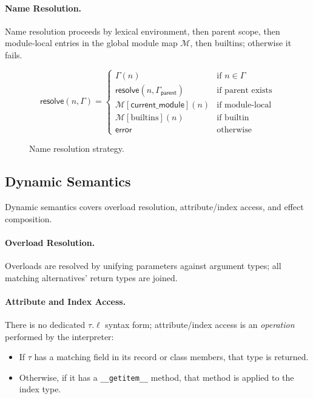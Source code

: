 \paragraph{Name Resolution.}  
Name resolution proceeds by lexical environment, then parent scope, then module‐local entries in the global module map $\mathcal{M}$, then builtins; otherwise it fails.

\begin{figure*}[t]
\centering
\[
\mathsf{resolve}(n, \Gamma) =
\begin{cases}
\Gamma(n) & \text{if } n \in \Gamma \\
\mathsf{resolve}(n, \Gamma_{\mathsf{parent}}) & \text{if parent exists} \\
\mathcal{M}[\mathsf{current\_module}](n) & \text{if module-local} \\
\mathcal{M}[\text{builtins}](n) & \text{if builtin} \\
\mathsf{error} & \text{otherwise}
\end{cases}
\]
\caption{Name resolution strategy.}
\label{fig:nameres}
\end{figure*}

\subsection{Dynamic Semantics}

Dynamic semantics covers overload resolution, attribute/index access, and effect composition.

\paragraph{Overload Resolution.}  
Overloads are resolved by unifying parameters against argument types; all matching alternatives’ return types are joined.

\paragraph{Attribute and Index Access.}  
There is no dedicated $\tau.\ell$ syntax form; attribute/index access is an \emph{operation} performed by the interpreter:  
\begin{itemize}
\item If $\tau$ has a matching field in its record or class members, that type is returned.
\item Otherwise, if it has a \texttt{\_\_getitem\_\_} method, that method is applied to the index type.
\end{itemize}

